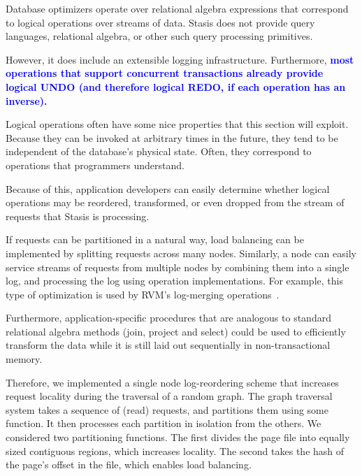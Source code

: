 \documentclass[letterpaper,twocolumn,10pt]{article}
\newcommand{\yad}{Stasis\xspace}
\newcommand{\diff}[1]{\textcolor{blue}{\bf #1}}
\begin{document}
Database optimizers operate over relational algebra expressions that
correspond to logical operations over streams of data.  \yad
does not provide query languages, relational algebra, or other such query processing primitives.  

However, it does include an extensible logging infrastructure.
Furthermore, \diff{most operations that support concurrent transactions already
provide logical UNDO (and therefore logical REDO, if each operation has an
inverse).}

Logical operations often have some nice properties that this section
will exploit.  Because they can be invoked at arbitrary times in the
future, they tend to be independent of the database's physical state.
Often, they correspond to operations that programmers understand.

Because of this, application developers can easily determine whether
logical operations may be reordered, transformed, or even
dropped from the stream of requests that \yad is processing.

If requests can be partitioned in a natural way, load
balancing can be implemented by splitting requests across many nodes.
Similarly, a node can easily service streams of requests from multiple
nodes by combining them into a single log, and processing the log
using operation implementations.  For example, this type of optimization 
is used by RVM's log-merging operations~\cite{lrvm}.

Furthermore, application-specific
procedures that are analogous to standard relational algebra methods
(join, project and select) could be used to efficiently transform the data
while it is still laid out sequentially
in non-transactional memory.


Therefore, we implemented a single node log-reordering scheme that increases request locality
during the traversal of a random graph.  The graph traversal system
takes a sequence of (read) requests, and partitions them using some
function.  It then processes each partition in isolation from the
others.  We considered two partitioning functions.  The first divides the page file
into equally sized contiguous regions, which increases locality.  The second takes the hash
of the page's offset in the file, which enables load balancing.
\end{document}
